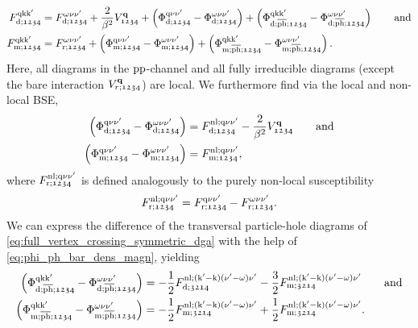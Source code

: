 \documentclass[../../main.tex]{subfiles}
\begin{document}
\begin{align}\label{eq:full_vertex_crossing_symmetric_dga}
	F^{\text{q}\text{k}\text{k}'}_{\text{d};\mathfrak{1234}}&=F^{\omega\nu\nu'}_{\text{d};\mathfrak{1234}}+\frac{2}{\beta^2}V_{\mathfrak{1234}}^{\textbf{q}}+\left (\Phi^{\text{q}\nu\nu'}_{\text{d};\mathfrak{1234}}-\Phi^{\omega\nu\nu'}_{\text{d};\mathfrak{1234}}\right )+\left (\Phi^{\text{q}\text{k}\text{k}'}_{\text{d};\overline{\text{ph}};\mathfrak{1234}}-\Phi^{\omega\nu\nu'}_{\text{d};\overline{\text{ph}};\mathfrak{1234}}\right )\qquad\text{and}\\
	F^{\text{q}\text{k}\text{k}'}_{\text{m};\mathfrak{1234}}&=F^{\omega\nu\nu'}_{\text{r};\mathfrak{1234}}+\left (\Phi^{\text{q}\nu\nu'}_{\text{m};\mathfrak{1234}}-\Phi^{\omega\nu\nu'}_{\text{m};\mathfrak{1234}}\right )+\left (\Phi^{\text{q}\text{k}\text{k}'}_{\text{m};\overline{\text{ph}};\mathfrak{1234}}-\Phi^{\omega\nu\nu'}_{\text{m};\overline{\text{ph}};\mathfrak{1234}}\right ).
\end{align}
Here, all diagrams in the $\text{pp}$-channel and all fully irreducible diagrams (except the bare interaction $V^{\textbf{q}}_{r;\mathfrak{1234}}$) are local. We furthermore find via the local and non-local BSE,
\begin{subequations}
\begin{align}
	\left (\Phi^{\text{q}\nu\nu'}_{\text{d};\mathfrak{1234}}-\Phi^{\omega\nu\nu'}_{\text{d};\mathfrak{1234}}\right )&=F_{\text{d};\mathfrak{1234}}^{\text{nl};\text{q}\nu\nu'}-\frac{2}{\beta^2}V^{\textbf{q}}_{\mathfrak{1234}}\qquad\text{and}\\
	\left (\Phi^{\text{q}\nu\nu'}_{\text{m};\mathfrak{1234}}-\Phi^{\omega\nu\nu'}_{\text{m};\mathfrak{1234}}\right )&=F_{\text{m};\mathfrak{1234}}^{\text{nl};\text{q}\nu\nu'},
\end{align}
\end{subequations}
where $F_{\text{r};\mathfrak{1234}}^{\text{nl};\text{q}\nu\nu'}$ is defined analogously to the purely non-local susceptibility 
\begin{align}
	F_{\text{r};\mathfrak{1234}}^{\text{nl};\text{q}\nu\nu'}=F_{\text{r};\mathfrak{1234}}^{\text{q}\nu\nu'}-F_{\text{r};\mathfrak{1234}}^{\omega\nu\nu'}.
\end{align}
We can express the difference of the transversal particle-hole diagrams of \eqref{eq:full_vertex_crossing_symmetric_dga} with the help of  \eqref{eq:phi_ph_bar_dens_magn}, yielding
\begin{subequations}
\begin{align}
	\left (\Phi^{\text{q}\text{k}\text{k}'}_{\text{d};\overline{\text{ph}};\mathfrak{1234}}-\Phi^{\omega\nu\nu'}_{\text{d};\overline{\text{ph}};\mathfrak{1234}}\right )&=-\frac12 F_{\text{d};\mathfrak{3214}}^{\text{nl};(\text{k}'-\text{k})(\nu'-\omega)\nu'}-\frac32 F_{\text{m};\mathfrak{3214}}^{\text{nl};(\text{k}'-\text{k})(\nu'-\omega)\nu'}\qquad\text{and}\\
	\left (\Phi^{\text{q}\text{k}\text{k}'}_{\text{m};\overline{\text{ph}};\mathfrak{1234}}-\Phi^{\omega\nu\nu'}_{\text{m};\overline{\text{ph}};\mathfrak{1234}}\right )&=-\frac12 F_{\text{m};\mathfrak{3214}}^{\text{nl};(\text{k}'-\text{k})(\nu'-\omega)\nu'}+\frac12 F_{\text{m};\mathfrak{3214}}^{\text{nl};(\text{k}'-\text{k})(\nu'-\omega)\nu'}.
\end{align}
\end{subequations}
\end{document}
